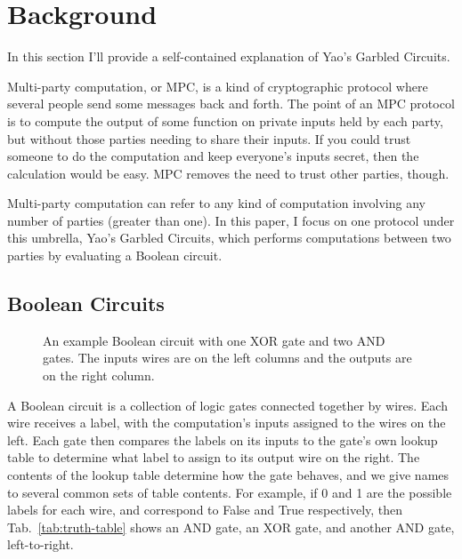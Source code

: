 \section{Background}

In this section I'll provide a self-contained explanation of Yao's Garbled Circuits.

Multi-party computation, or MPC, is a kind of cryptographic protocol where several people send some messages back and forth. The point of an MPC protocol is to compute the output of some function on private inputs held by each party, but without those parties needing to share their inputs. If you could trust someone to do the computation and keep everyone's inputs secret, then the calculation would be easy. MPC removes the need to trust other parties, though.

Multi-party computation can refer to any kind of computation involving any number of parties (greater than one). In this paper, I focus on one protocol under this umbrella, Yao's Garbled Circuits, which performs computations between two parties by evaluating a Boolean circuit.

\subsection{Boolean Circuits}

\begin{figure}[b]
	\centering
	\caption{An example Boolean circuit with one XOR gate and two AND gates. The inputs wires are on the left columns and the outputs are on the right column.}%
	\label{fig:circuit}
\end{figure}

A Boolean circuit is a collection of logic gates connected together by wires. Each wire receives a label, with the computation's inputs assigned to the wires on the left. Each gate then compares the labels on its inputs to the gate's own lookup table to determine what label to assign to its output wire on the right. The contents of the lookup table determine how the gate behaves, and we give names to several common sets of table contents. For example, if 0 and 1 are the possible labels for each wire, and correspond to False and True respectively, then Tab.~\ref{tab:truth-table} shows an AND gate, an XOR gate, and another AND gate, left-to-right.

